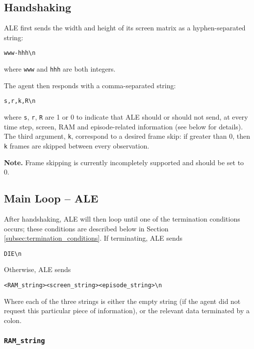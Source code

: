 \documentclass[12pt]{article}
\begin{document}
\subsection{Handshaking}

ALE first sends the width and height of its screen matrix as a hyphen-separated string:

\begin{verbatim}
www-hhh\n
\end{verbatim}

where \verb+www+ and \verb+hhh+ are both integers.

The agent then responds with a comma-separated string:

\begin{verbatim}
s,r,k,R\n
\end{verbatim}

where \verb+s+, \verb+r+, \verb+R+ are 1 or 0 to indicate that ALE should or should not send, at every time step, screen, RAM and episode-related information (see below for details). The third argument, \verb+k+, correspond to a desired frame skip: if greater than 0, then \verb+k+ frames are skipped between every observation.

\textbf{Note.} Frame skipping is currently incompletely supported and should be set to 0.

\subsection{Main Loop -- ALE}

After handshaking, ALE will then loop until one of the termination conditions occurs; these conditions are described below in Section \ref{subsec:termination_conditions}. If terminating, ALE sends

\begin{verbatim}
DIE\n
\end{verbatim}

Otherwise, ALE sends

\begin{verbatim}
<RAM_string><screen_string><episode_string>\n
\end{verbatim}

Where each of the three strings is either the empty string (if the agent did not request this
particular piece of information), or the relevant data terminated by a colon.

\subsubsection{\texttt{RAM\_string}}
\end{document}

